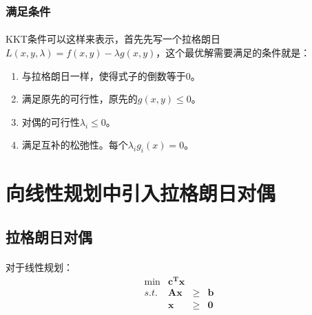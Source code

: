 \begin{figure}[h]
\begin{minipage}{0.49\textwidth}
\end{minipage}
\end{figure}
		\subsubsection{满足条件}
		\paragraph{}KKT条件可以这样来表示，首先先写一个拉格朗日$L(x,y,\lambda) = f(x,y) - \lambda g(x,y) $，这个最优解需要满足的条件就是：
		\begin{enumerate}
			\item 与拉格朗日一样，使得式子的倒数等于0。
			\item 满足原先的可行性，原先的$g(x,y) \leq 0$。
			\item 对偶的可行性$ \lambda_i \leq 0 $。
			\item 满足互补的松弛性。每个$ \lambda_ig_i(x) = 0$。
		\end{enumerate}
	\section{向线性规划中引入拉格朗日对偶}
	\subsection{拉格朗日对偶}
	\paragraph{}对于线性规划：
		\[
		\begin{array}{rrrrrrrrl}
 			\min & \mathbf{c^T x} &  & \\
 			s.t. & \mathbf{A x } & \geq&  \mathbf{b }\\
      		& \mathbf{x} & \geq& \mathbf{0} 
		\end{array} \nonumber
		\]
